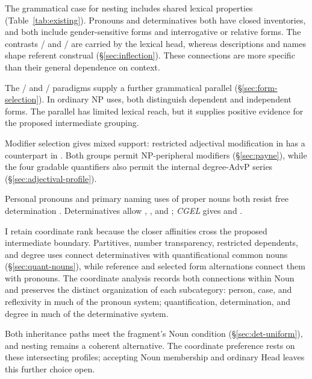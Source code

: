 \documentclass[12pt]{article}
\begin{document}
The grammatical case for nesting includes shared lexical properties (Table~\ref{tab:existing}). Pronouns and determinatives both have closed inventories, and both include gender-sensitive forms and interrogative or relative forms. The contrasts / and / are carried by the lexical head, whereas descriptions and names shape referent construal (§\ref{sec:inflection}). These connections are more specific than their general dependence on context.

The / and / paradigms supply a further grammatical parallel (§\ref{sec:form-selection}). In ordinary NP uses, both distinguish dependent and independent forms. The parallel has limited lexical reach, but it supplies positive evidence for the proposed intermediate grouping.

Modifier selection gives mixed support: restricted adjectival modification in  \citep[429--430]{huddleston2002} has a counterpart in . Both groups permit NP-peripheral modifiers (§\ref{sec:payne}), while the four gradable quantifiers also permit the internal degree-AdvP series (§\ref{sec:adjectival-profile}).

Personal pronouns and primary naming uses of proper nouns both resist free determination \citep[429--430, 517, 519--520]{huddleston2002}. Determinatives allow , , and ; \textit{CGEL} gives  and  \citep[415--416]{huddleston2002}.

I retain coordinate rank because the closer affinities cross the proposed intermediate boundary. Partitives, number transparency, restricted dependents, and degree uses connect determinatives with quantificational common nouns (§\ref{sec:quant-nouns}), while reference and selected form alternations connect them with pronouns. The coordinate analysis records both connections within Noun and preserves the distinct organization of each subcategory: person, case, and reflexivity in much of the pronoun system; quantification, determination, and degree in much of the determinative system.

Both inheritance paths meet the fragment's Noun condition (§\ref{sec:det-uniform}), and nesting remains a coherent alternative. The coordinate preference rests on these intersecting profiles; accepting Noun membership and ordinary Head leaves this further choice open.
\end{document}
